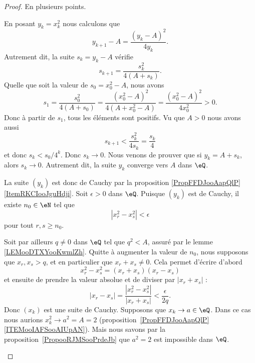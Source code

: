 \begin{proof}
	En plusieurs points.
	\begin{subproof}
		\spitem[La suite \( s_k\)]
		En posant \( y_k=x_k^2\) nous calculons que
		\begin{equation}
			y_{k+1}-A=\frac{ (y_k-A)^2 }{ 4y_k }.
		\end{equation}
		Autrement dit, la suite \( s_k=y_k-A\) vérifie
		\begin{equation}
			s_{k+1}=\frac{ s_k^2 }{ 4(A+s_k) }.
		\end{equation}
		Quelle que soit la valeur de \( s_0=x_0^2-A\), nous avons
		\begin{equation}
			s_1=\frac{ s_0^2 }{ 4(A+s_0) }=\frac{ (x_0^2-A)^2 }{ 4(A+x_0^2-A) }=\frac{ (x_0^2-A)^2 }{ 4x_0^2 }>0.
		\end{equation}
		Donc à partir de \( s_1\), tous les éléments sont positifs. Vu que \( A>0\) nous avons aussi
		\begin{equation}
			s_{k+1}<\frac{ s_k^2 }{ 4s_k }=\frac{ s_k }{ 4 }
		\end{equation}
		et donc \( s_k<s_0/4^k\). Donc \( s_k\to 0\).
		\spitem[La suite \( (y_k)\)]
		Nous venons de prouver que si \( y_k=A+s_k\), alors \( s_k\to 0\). Autrement dit, la suite \( y_k\) converge vers \( A\) dans \( \eQ\).

		La suite \( (y_k)\) est donc de Cauchy par la proposition \ref{PropFFDJooAapQlP}\ref{ItemRKCIooJguHdji}.
		Soit \( \epsilon>0\) dans \( \eQ\). Puisque \( (y_k)\) est de Cauchy, il existe \( n_0\in \eN\) tel que
		\begin{equation}
			| x^2_r-x_s^2 |<\epsilon
		\end{equation}
		pour tout \( r,s\geq n_0\).

		Soit par ailleurs \( q\neq 0\) dans \( \eQ\) tel que \( q^2<A\), assuré par le lemme \ref{LEMooDTXYooKwmlZh}. Quitte à augmenter la valeur de \( n_0\), nous supposons que \( x_r,x_s>q\), et en particulier que \( x_r+x_s\neq 0\). Cela permet d'écrire d'abord
		\begin{equation}
			x_r^2-x_s^2=(x_r+x_s)(x_r-x_s)
		\end{equation}
		et ensuite de prendre la valeur absolue et de diviser par \( | x_r+x_s |\) :
		\begin{equation}
			| x_r-x_s |=\frac{ | x_r^2-x_s^2 | }{ | x_r+x_s | }<\frac{ \epsilon }{ 2q }.
		\end{equation}
		Donc \( (x_k)\) est une suite de Cauchy.
		\spitem[Pas de convergence pour \( A=2\)]
		Supposons que \( x_k\to a\in \eQ\). Dans ce cas nous aurions \( x_k^2\to a^2=A=2\) (proposition~\ref{PropFFDJooAapQlP}\ref{ITEMooIAFSooAIUpAN}). Mais nous savons par la proposition~\ref{PropooRJMSooPrdeJb} que \( a^2=2\) est impossible dans \( \eQ\).
	\end{subproof}
\end{proof}

